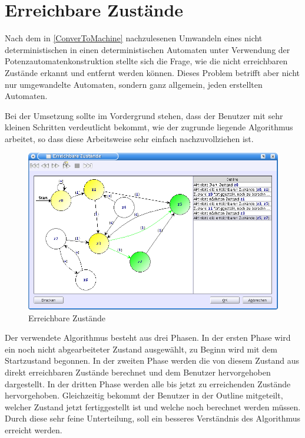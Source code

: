 \section{Erreichbare Zustände}\label{ReachableStates}

Nach dem in \ref{ConverToMachine} nachzulesenen Umwandeln eines nicht
deterministischen in einen deterministischen Automaten unter Verwendung der
Potenzautomatenkonstruktion stellte sich die Frage, wie die nicht erreichbaren
Zustände erkannt und entfernt werden können. Dieses Problem betrifft aber nicht
nur umgewandelte Automaten, sondern ganz allgemein, jeden erstellten
Automaten.\vspace{10pt}

Bei der Umsetzung sollte im Vordergrund stehen, dass der Benutzer mit sehr
kleinen Schritten verdeutlicht bekommt, wie der zugrunde liegende Algorithmus
arbeitet, so dass diese Arbeitsweise sehr einfach nachzuvollziehen
ist.\vspace{10pt}

\begin{figure}[h!]
\begin{center}
\includegraphics[width=12cm]{../images/reachable_states.png}
\caption{Erreichbare Zustände}
\end{center}
\end{figure}

Der verwendete Algorithmus besteht aus drei Phasen. In der ersten Phase wird ein
noch nicht abgearbeiteter Zustand ausgewählt, zu Beginn wird mit dem Startzustand
begonnen. In der zweiten Phase werden die von diesem Zustand aus direkt
erreichbaren Zustände berechnet und dem Benutzer hervorgehoben dargestellt. In
der dritten Phase werden alle bis jetzt zu erreichenden Zustände hervorgehoben.
Gleichzeitig bekommt der Benutzer in der Outline mitgeteilt, welcher Zustand
jetzt fertiggestellt ist und welche noch berechnet werden müssen. Durch diese
sehr feine Unterteilung, soll ein besseres Verständnis des Algorithmus erreicht
werden.
